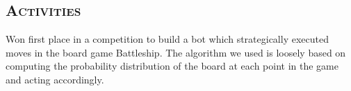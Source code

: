\begin{resume}





  \section{\textsc{Activities}}

  \begin{position}
    Won first place in a competition to build a bot which strategically executed moves in the board game Battleship. The algorithm we used is loosely based on computing the probability distribution of the board at each point in the game and acting accordingly. 
  \end{position}


\end{resume}

